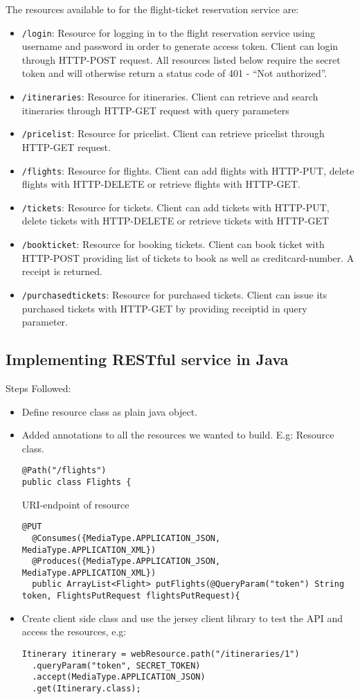 \documentclass[a4paper, 11pt]{article}
\begin{document}
The resources available to for the flight-ticket reservation service are:
\begin{itemize}
\item \texttt{/login}: Resource for logging in to the flight reservation service using username and password in order to generate access token. Client can login through HTTP-POST request. All resources listed below require the secret token and will otherwise return a status code of 401 - ``Not authorized''.
\item \texttt{/itineraries}: Resource for itineraries. Client can retrieve and search itineraries through HTTP-GET request with query parameters
\item \texttt{/pricelist}: Resource for pricelist. Client can retrieve pricelist through HTTP-GET request.
\item \texttt{/flights}: Resource for flights. Client can add flights with HTTP-PUT, delete flights with HTTP-DELETE or retrieve flights with HTTP-GET.
\item \texttt{/tickets}: Resource for tickets. Client can add tickets with HTTP-PUT, delete tickets with HTTP-DELETE or retrieve tickets with HTTP-GET
\item \texttt{/bookticket}: Resource for booking tickets. Client can book ticket with HTTP-POST providing list of tickets to book as well as creditcard-number. A receipt is returned.
\item \texttt{/purchasedtickets}: Resource for purchased tickets. Client can issue its purchased tickets with HTTP-GET by providing receiptid in query parameter.
\end{itemize}

\subsection*{Implementing RESTful service in Java}
Steps Followed:
\begin{itemize}
\item Define resource class as plain java object. 
\item Added annotations to all the resources we wanted to build. E.g:
Resource class.
 \begin{lstlisting}[frame=single,style=java]
@Path("/flights")
public class Flights {
\end{lstlisting}
\newpage URI-endpoint of resource
\begin{lstlisting}[frame=single,style=java]
  @PUT
  @Consumes({MediaType.APPLICATION_JSON, MediaType.APPLICATION_XML})
  @Produces({MediaType.APPLICATION_JSON, MediaType.APPLICATION_XML})
  public ArrayList<Flight> putFlights(@QueryParam("token") String token, FlightsPutRequest flightsPutRequest){
  \end{lstlisting}
\item Create client side class and use the jersey client library to test the API and access the resources, e.g:
\begin{lstlisting}[frame=single,style=java]
  Itinerary itinerary = webResource.path("/itineraries/1")
  .queryParam("token", SECRET_TOKEN)
  .accept(MediaType.APPLICATION_JSON)
  .get(Itinerary.class);
\end{lstlisting} 
\end{itemize}
\end{document}
